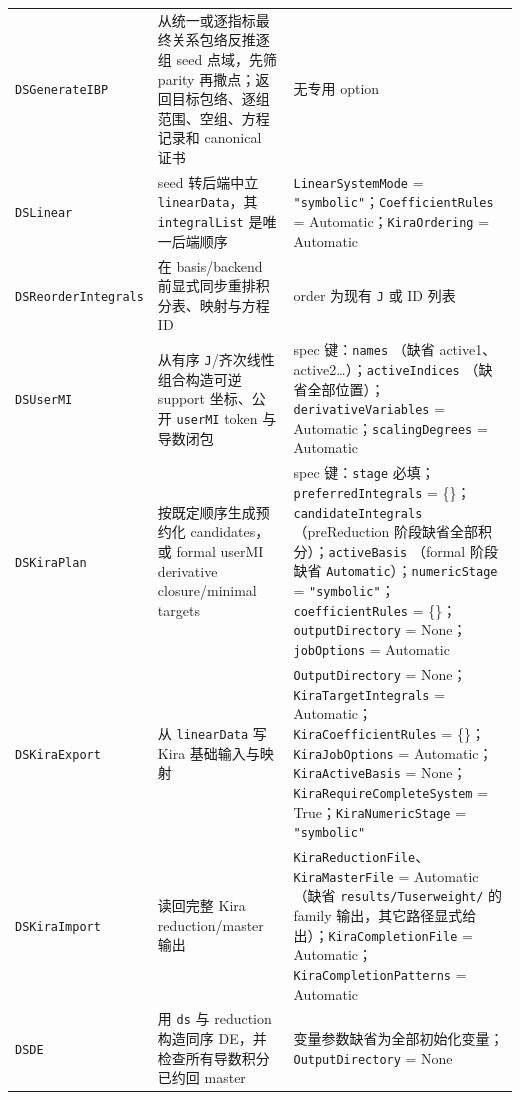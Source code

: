 ﻿\documentclass[a4paper,11pt]{article}
\begin{document}
\begin{longtable}{@{}>{\raggedright\arraybackslash}p{}>{\raggedright\arraybackslash}p{}>{\raggedright\arraybackslash}p{}@{}}
\texttt{DSGenerateIBP} & 从统一或逐指标最终关系包络反推逐组 seed 点域，先筛 parity 再撒点；返回目标包络、逐组范围、空组、方程记录和 canonical 证书 & 无专用 option \\
\texttt{DSLinear} & seed 转后端中立 \texttt{linearData}，其 \texttt{integralList} 是唯一后端顺序 & \texttt{LinearSystemMode} = \texttt{"symbolic"}；\allowbreak\texttt{CoefficientRules} = Automatic；\allowbreak\texttt{KiraOrdering} = Automatic \\
\texttt{DSReorderIntegrals} & 在 basis/backend 前显式同步重排积分表、映射与方程 ID & order 为现有 \texttt{J} 或 ID 列表 \\
\texttt{DSUserMI} & 从有序 \texttt{J}/齐次线性组合构造可逆 support 坐标、公开 \texttt{userMI} token 与导数闭包 & spec 键：\texttt{names} （缺省 active1、active2…）；\allowbreak\texttt{activeIndices} （缺省全部位置）；\allowbreak\texttt{derivativeVariables} = Automatic；\allowbreak\texttt{scalingDegrees} = Automatic \\
\texttt{DSKiraPlan} & 按既定顺序生成预约化 candidates，或 formal userMI derivative closure/minimal targets & spec 键：\texttt{stage} 必填；\allowbreak\texttt{preferredIntegrals} = \{\}；\allowbreak\texttt{candidateIntegrals} （preReduction 阶段缺省全部积分）；\allowbreak\texttt{activeBasis} （formal 阶段缺省 \texttt{Automatic}）；\allowbreak\texttt{numericStage} = \texttt{"symbolic"}；\allowbreak\texttt{coefficientRules} = \{\}；\allowbreak\texttt{outputDirectory} = None；\allowbreak\texttt{jobOptions} = Automatic \\
\texttt{DSKiraExport} & 从 \texttt{linearData} 写 Kira 基础输入与映射 & \texttt{OutputDirectory} = None；\allowbreak\texttt{KiraTargetIntegrals} = Automatic；\allowbreak\texttt{KiraCoefficientRules} = \{\}；\allowbreak\texttt{KiraJobOptions} = Automatic；\allowbreak\texttt{KiraActiveBasis} = None；\allowbreak\texttt{KiraRequireCompleteSystem} = True；\allowbreak\texttt{KiraNumericStage} = \texttt{"symbolic"} \\
\texttt{DSKiraImport} & 读回完整 Kira reduction/master 输出 & \texttt{KiraReductionFile}、\allowbreak\texttt{KiraMasterFile} = Automatic （缺省 \texttt{results/Tuserweight/} 的 family 输出，其它路径显式给出）；\allowbreak\texttt{KiraCompletionFile} = Automatic；\allowbreak\texttt{KiraCompletionPatterns} = Automatic \\
\texttt{DSDE} & 用 \texttt{ds} 与 reduction 构造同序 DE，并检查所有导数积分已约回 master & 变量参数缺省为全部初始化变量；\allowbreak\texttt{OutputDirectory} = None \\

\end{longtable}
\end{document}
